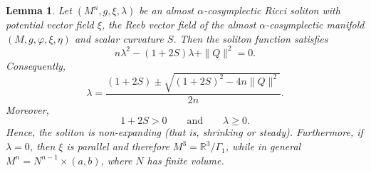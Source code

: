\documentclass[a4paper, twoside, 10pt]{article}
\numberwithin{equation}{section}
\newtheorem{lemma}{Lemma}[section]
\theoremstyle{definition}
\begin{document}
\begin{lemma}\label{alpha-cosym}
Let $(M^n,g,\xi,\lambda)$ be an almost $\alpha$-cosymplectic
Ricci soliton with potential vector field $\xi$, the Reeb vector
field of the almost $\alpha$-cosymplectic manifold
$(M,g,\varphi,\xi,\eta)$ and scalar curvature $S$.
Then the soliton function satisfies
\[
n\lambda^2-(1+2S)\lambda+\|Q\|^2=0.
\]
Consequently,
\begin{equation}\label{lambdaeq}
\lambda=
\frac{(1+2S)\pm\sqrt{(1+2S)^2-4n\|Q\|^2}}{2n}.
\end{equation}
Moreover,
\[
1+2S>0
\qquad\text{and}\qquad
\lambda\ge0.
\]
Hence, the soliton is non-expanding (that is, shrinking or steady).
Furthermore, if $\lambda=0$, then $\xi$ is parallel and therefore
$M^3=\mathbb R^3/\Gamma_1$, while in general
$M^n=N^{n-1}\times(a,b)$, where $N$ has finite volume.
\end{lemma}
\end{document}
